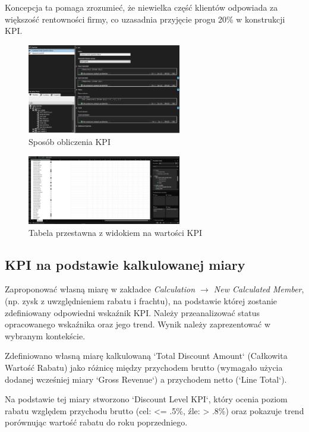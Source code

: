 \documentclass[a4paper,12pt]{article}
\begin{document}
Koncepcja ta pomaga zrozumieć, że niewielka część klientów odpowiada za większość rentowności firmy, co uzasadnia przyjęcie progu 20\% w konstrukcji KPI. \cite{whale_curve}

\begin{figure}[H]
  \includegraphics[width=0.6\textwidth]{images/5a.png}
  \caption{Sposób obliczenia KPI}
\end{figure}

\begin{figure}[H]
  \includegraphics[width=0.6\textwidth]{images/5a_analysis.png}
  \caption{Tabela przestawna z widokiem na wartości KPI}
\end{figure}

\subsection{KPI na podstawie kalkulowanej miary}

Zaproponować własną miarę w zakładce \textit{Calculation $\rightarrow$ New Calculated Member}, (np. zysk z uwzględnieniem rabatu i frachtu), na podstawie której zostanie zdefiniowany odpowiedni wskaźnik KPI. Należy przeanalizować status opracowanego wskaźnika oraz jego trend. Wynik należy zaprezentować w wybranym kontekście.

Zdefiniowano własną miarę kalkulowaną `Total Discount Amount` (Całkowita Wartość Rabatu) jako różnicę między przychodem brutto (wymagało użycia dodanej wcześniej miary `Gross Revenue`) a przychodem netto (`Line Total`).

Na podstawie tej miary stworzono `Discount Level KPI`, który ocenia poziom rabatu względem przychodu brutto (cel: <= .5\%, źle: > .8\%) oraz pokazuje trend porównując wartość rabatu do roku poprzedniego.
\end{document}
